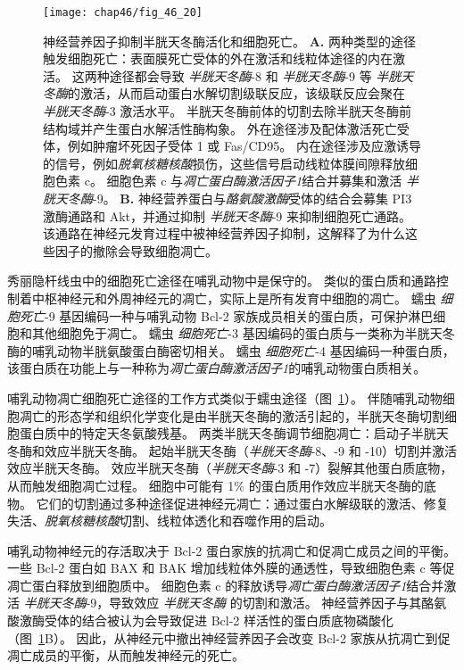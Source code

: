 \begin{figure}[htbp]
	\centering
	\texttt{[image: chap46/fig\_46\_20]}
	\caption{神经营养因子抑制半胱天冬酶活化和细胞死亡\cite{jesenberger2002deadly}。
		\textbf{A.} 两种类型的途径触发细胞死亡：表面膜死亡受体的外在激活和线粒体途径的内在激活。
		这两种途径都会导致 \textit{半胱天冬酶}-8 和 \textit{半胱天冬酶}-9 等 \textit{半胱天冬酶}的激活，从而启动蛋白水解切割级联反应，该级联反应会聚在 \textit{半胱天冬酶}-3 激活水平。
		半胱天冬酶前体的切割去除半胱天冬酶前结构域并产生蛋白水解活性酶构象。
		外在途径涉及配体激活死亡受体，例如肿瘤坏死因子受体 1 或 Fas/CD95。
		内在途径涉及应激诱导的信号，例如\textit{脱氧核糖核酸}损伤，这些信号启动线粒体膜间隙释放细胞色素 c。
		细胞色素 c 与\textit{凋亡蛋白酶激活因子1}结合并募集和激活 \textit{半胱天冬酶}-9。
		\textbf{B.} 神经营养蛋白与\textit{酪氨酸激酶}受体的结合会募集 PI3 激酶通路和 Akt，并通过抑制 \textit{半胱天冬酶}-9 来抑制细胞死亡通路。
		该通路在神经元发育过程中被神经营养因子抑制，这解释了为什么这些因子的撤除会导致细胞凋亡。}
	\label{fig:46_20}
\end{figure}


秀丽隐杆线虫中的细胞死亡途径在哺乳动物中是保守的。
类似的蛋白质和通路控制着中枢神经元和外周神经元的凋亡，实际上是所有发育中细胞的凋亡。
蠕虫 \textit{细胞死亡}-9 基因编码一种与哺乳动物 Bcl-2 家族成员相关的蛋白质，可保护淋巴细胞和其他细胞免于凋亡。
蠕虫 \textit{细胞死亡}-3 基因编码的蛋白质与一类称为半胱天冬酶的哺乳动物半胱氨酸蛋白酶密切相关。
蠕虫 \textit{细胞死亡}-4 基因编码一种蛋白质，该蛋白质在功能上与一种称为\textit{凋亡蛋白酶激活因子1}的哺乳动物蛋白质相关。


哺乳动物凋亡细胞死亡途径的工作方式类似于蠕虫途径（图~\ref{fig:46_20}）。
伴随哺乳动物细胞凋亡的形态学和组织化学变化是由半胱天冬酶的激活引起的，半胱天冬酶切割细胞蛋白质中的特定天冬氨酸残基。
两类半胱天冬酶调节细胞凋亡：启动子半胱天冬酶和效应半胱天冬酶。 起始半胱天冬酶（\textit{半胱天冬酶}-8、-9 和 -10）切割并激活效应半胱天冬酶。
效应半胱天冬酶（\textit{半胱天冬酶}-3 和 -7）裂解其他蛋白质底物，从而触发细胞凋亡过程。
细胞中可能有 1\% 的蛋白质用作效应半胱天冬酶的底物。
它们的切割通过多种途径促进神经元凋亡：通过蛋白水解级联的激活、修复失活、\textit{脱氧核糖核酸}切割、线粒体透化和吞噬作用的启动。


哺乳动物神经元的存活取决于 Bcl-2 蛋白家族的抗凋亡和促凋亡成员之间的平衡。
一些 Bcl-2 蛋白如 BAX 和 BAK 增加线粒体外膜的通透性，导致细胞色素 c 等促凋亡蛋白释放到细胞质中。
细胞色素 c 的释放诱导\textit{凋亡蛋白酶激活因子1}结合并激活 \textit{半胱天冬酶}-9，导致效应 \textit{半胱天冬酶} 的切割和激活。
神经营养因子与其酪氨酸激酶受体的结合被认为会导致促进 Bcl-2 样活性的蛋白质底物磷酸化（图~\ref{fig:46_20}B）。
因此，从神经元中撤出神经营养因子会改变 Bcl-2 家族从抗凋亡到促凋亡成员的平衡，从而触发神经元的死亡。


